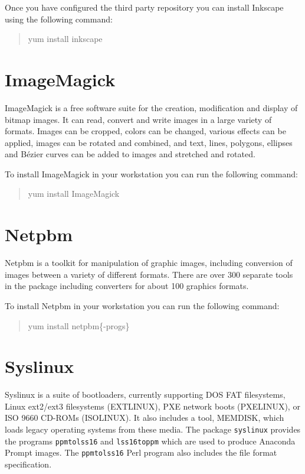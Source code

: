 Once you have configured the third party repository you can install
Inkscape using the following command:

\begin{quote}
yum install inkscape
\end{quote}

\section{ImageMagick}

ImageMagick is a free software suite for the creation, modification
and display of bitmap images. It can read, convert and  write images
in a large variety of formats. Images can be cropped, colors can be
changed, various effects can be applied, images can  be rotated  and
combined,  and text, lines, polygons, ellipses and Bézier curves can
be added to images and stretched and rotated.

To install ImageMagick in your workstation you can run the following
command:

\begin{quote}
yum install ImageMagick
\end{quote}

\section{Netpbm}

Netpbm is a toolkit for manipulation of graphic images, including
conversion of images between a variety of different formats.  There
are over 300 separate tools in the package including converters for
about 100 graphics formats.

To install Netpbm in your workstation you can run the following
command:

\begin{quote}
yum install netpbm\{-progs\}
\end{quote}

\section{Syslinux}

Syslinux is a suite of bootloaders, currently supporting DOS FAT
filesystems, Linux ext2/ext3 filesystems (EXTLINUX), PXE network boots
(PXELINUX), or ISO 9660 CD-ROMs (ISOLINUX).  It also includes a tool,
MEMDISK, which loads legacy operating systems from these media.  The
package \texttt{syslinux} provides the programs \texttt{ppmtolss16}
and \texttt{lss16toppm} which are used to produce Anaconda Prompt
images. The \texttt{ppmtolss16} Perl program also includes the file
format specification.

